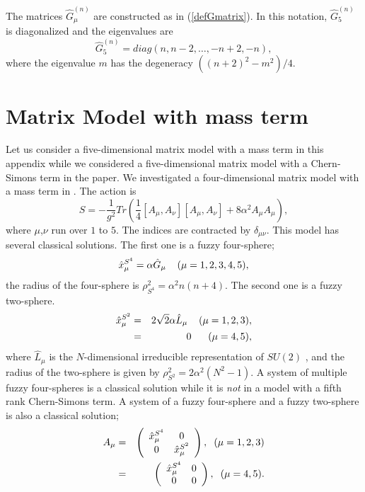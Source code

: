 \documentclass[a4paper,11pt]{article}
\begin{document}
The matrices $\hat{G}_{\mu}^{(n)}$ are constructed 
as in (\ref{defGmatrix}). 
In this notation, $\hat{G}_{5}^{(n)}$ is diagonalized and 
the eigenvalues are 
\begin{equation}
\hat{G}_{5}^{(n)}=diag(n,n-2,\ldots,-n+2,-n),  
\end{equation}
where the eigenvalue $m$ has 
the degeneracy $((n+2)^{2}-m^{2})/4$. 

\section{Matrix Model with mass term}
\setcounter{equation}{0} 
\hspace{0.4cm}
Let us consider a five-dimensional matrix model 
with a mass term in this appendix while 
we considered a five-dimensional matrix model 
with a Chern-Simons term in the paper. 
We investigated a four-dimensional matrix model 
with a mass term in \cite{yk2}. 
The action is  
\begin{equation}
S=-\frac{1}{g^{2}}Tr\left(
\frac{1}{4}[A_{\mu},A_{\nu}][A_{\mu},A_{\nu}]
+8\alpha^{2}A_{\mu}A_{\mu}
\right), 
\end{equation} 
where $\mu$,$\nu$ run over $1$ to $5$. 
The indices are contracted by $\delta_{\mu\nu}$. 
This model has several classical solutions. 
The first one is a fuzzy four-sphere; 
\begin{equation}
\hat{x}_{\mu}^{S^{4}}=\alpha \hat{G}_{\mu}
\hspace{0.4cm}(\mu=1,2,3,4,5), 
\label{fourmass}
\end{equation}
the radius of the four-sphere is 
$\rho_{S^{4}}^{2}=\alpha^{2}n(n+4)$.
The second one is a fuzzy two-sphere. 
\begin{eqnarray}
\hat{x}_{\mu}^{S^{2}}&=&2\sqrt{2}\alpha \hat{L}_{\mu}
\hspace{0.4cm}(\mu=1,2,3), \cr 
&=&0
\hspace{0.6cm}(\mu=4,5), 
\label{twomass}
\end{eqnarray}
where $\hat{L}_{\mu}$ is the $N$-dimensional irreducible 
representation of $SU(2)$ , and the radius of the two-sphere is 
given by $\rho_{S^{2}}^{2}=2\alpha^{2}(N^{2}-1)$. 
A system of multiple fuzzy four-spheres is a classical solution while 
it is {\it not} in a model with a fifth rank Chern-Simons term. 
A system of a fuzzy four-sphere and a fuzzy two-sphere is also 
a classical solution;  
\begin{eqnarray} 
A_{\mu}  
 &=&   \left( \begin{array}{c c}
  \hat{x}_{\mu}^{S^{4}} & 0 \\ 
 0  &  \hat{x}_{\mu}^{S^{2}}  \\
 \end{array} \right), \hspace{0.2cm}(\mu=1,2,3)     \cr
 &=&   \left( \begin{array}{c c}
  \hat{x}_{\mu}^{S^{4}} & 0 \\ 
  0  & 0   \\
 \end{array} \right), \hspace{0.2cm}(\mu=4,5) .        
\end{eqnarray}
\end{document}

